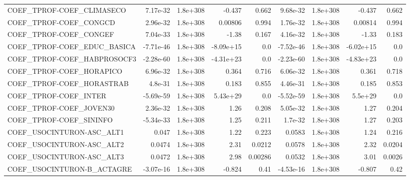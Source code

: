 \begin{tabular}{lrrrrrrrr}
COEF\_TPROF-COEF\_CLIMASECO         &    7.17e-32 &     1.8e+308 &    -0.437 &    0.662 &   9.68e-32 &    1.8e+308 &       -0.437 &         0.662 \\
COEF\_TPROF-COEF\_CONGCD            &    2.96e-32 &     1.8e+308 &   0.00806 &    0.994 &   1.76e-32 &    1.8e+308 &      0.00814 &         0.994 \\
COEF\_TPROF-COEF\_CONGEF            &    7.04e-33 &     1.8e+308 &     -1.38 &    0.167 &   4.16e-32 &    1.8e+308 &        -1.33 &         0.183 \\
COEF\_TPROF-COEF\_EDUC\_BASICA       &   -7.71e-46 &     1.8e+308 & -8.09e+15 &      0.0 &  -7.52e-46 &    1.8e+308 &    -6.02e+15 &           0.0 \\
COEF\_TPROF-COEF\_HABPROSOCF3       &   -2.28e-60 &     1.8e+308 & -4.31e+23 &      0.0 &  -2.23e-60 &    1.8e+308 &    -4.83e+23 &           0.0 \\
COEF\_TPROF-COEF\_HORAPICO          &    6.96e-32 &     1.8e+308 &     0.364 &    0.716 &   6.06e-32 &    1.8e+308 &        0.361 &         0.718 \\
COEF\_TPROF-COEF\_HORASTRAB         &     4.8e-31 &     1.8e+308 &     0.183 &    0.855 &   4.46e-31 &    1.8e+308 &        0.185 &         0.853 \\
COEF\_TPROF-COEF\_INTER             &   -5.69e-59 &     1.8e+308 &  5.43e+29 &      0.0 &  -5.52e-59 &    1.8e+308 &      5.5e+29 &           0.0 \\
COEF\_TPROF-COEF\_JOVEN30           &    2.36e-32 &     1.8e+308 &      1.26 &    0.208 &   5.05e-32 &    1.8e+308 &         1.27 &         0.204 \\
COEF\_TPROF-COEF\_SININFO           &   -5.34e-33 &     1.8e+308 &      1.25 &    0.211 &    1.7e-32 &    1.8e+308 &         1.27 &         0.203 \\
COEF\_USOCINTURON-ASC\_ALT1         &       0.047 &     1.8e+308 &      1.22 &    0.223 &     0.0583 &    1.8e+308 &         1.24 &         0.216 \\
COEF\_USOCINTURON-ASC\_ALT2         &      0.0474 &     1.8e+308 &      2.31 &   0.0212 &     0.0578 &    1.8e+308 &         2.32 &        0.0204 \\
COEF\_USOCINTURON-ASC\_ALT3         &      0.0472 &     1.8e+308 &      2.98 &  0.00286 &     0.0532 &    1.8e+308 &         3.01 &        0.0026 \\
COEF\_USOCINTURON-B\_ACTAGRE        &   -3.07e-16 &     1.8e+308 &    -0.824 &     0.41 &  -4.53e-16 &    1.8e+308 &       -0.807 &          0.42 \\

\end{tabular}
